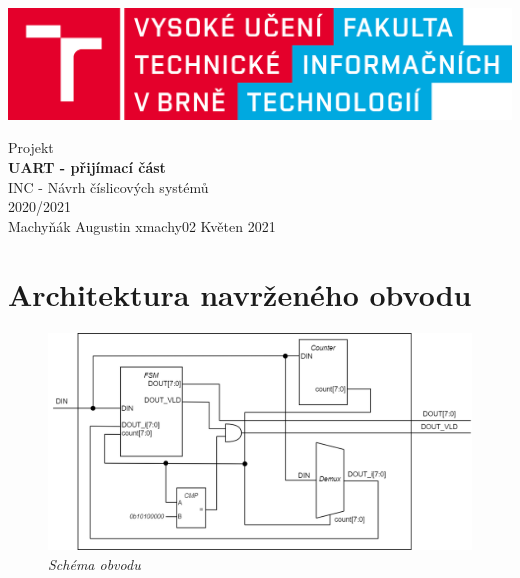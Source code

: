 \documentclass[12pt]{article}
\begin{document}
  \begin{titlepage}
    \begin{center}
      \includegraphics[scale=0.1]{logo_cz}
    \end{center}
    \begin{center}
      \vspace{1.5cm}
      {\Large Projekt} \\
      \vspace{0.5cm}
      \textbf{\Large UART - přijímací část} \\
      \vspace{1.5cm}
      {\large INC - Návrh číslicových systémů} \\
      \vspace{0.5cm}
      {\large 2020/2021} \\
      \vfill
      Machyňák Augustin \hfill xmachy02 \hfill Květen 2021
    \end{center}
  \end{titlepage}

\newpage

\section{Architektura navrženého obvodu}
\begin{center}
  \begin{figure}[h!]
    \hfill\includegraphics[scale=0.4]{rtl}\hspace*{\fill}
    \caption{\textit{Schéma obvodu}}
  \end{figure}
\end{center}
\end{document}
